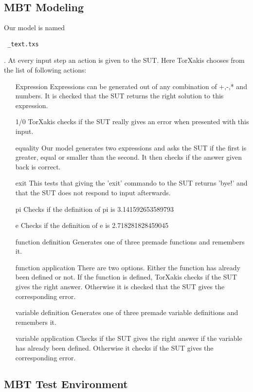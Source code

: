 \documentclass[11pt,a4paper]{article}
\begin{document}
\subsection{MBT Modeling}
Our model is named \begin{verbatim} _text.txs \end{verbatim}. At every input step an action is given to the SUT. Here TorXakis chooses from the list of following actions:
\begin{itemize}
	\item[Expression] Expressions can be generated out of any combination of +,-,* and numbers. It is checked that the SUT returns the right solution to this expression.
	\item[1/0] TorXakis checks if the SUT really gives an error when presented with this input.
	\item[equality] Our model generates two expressions and asks the SUT if the first is greater, equal or smaller than the second. It then checks if the answer given back is correct.
	\item[exit] This tests that giving the 'exit' commando to the SUT returns 'bye!' and that the SUT does not respond to input afterwards.
	\item[pi] Checks if the definition of pi is 3.141592653589793
	\item[e] Checks if the definition of e is 2.718281828459045
	\item[function definition] Generates one of three premade functions and remembers it.
	\item[function application] There are two options. Either the function has already been defined or not. If the function is defined, TorXakis checks if the SUT gives the right answer. Otherwise it is checked that the SUT gives the corresponding error.
	\item[variable definition] Generates one of three premade variable definitions and remembers it.
	\item[variable application] Checks if the SUT gives the right answer if the variable has already been defined. Otherwise it checks if the SUT gives the corresponding error.
\end{itemize}



\subsection{MBT Test Environment}
\end{document}
